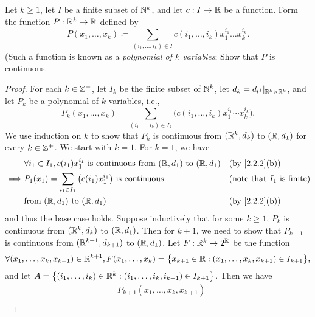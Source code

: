 \begin{ex}\label{ex:2.2.7}
  Let \(k \geq 1\), let \(I\) be a finite subset of \(\mathbb{N}^k\), and let \(c : I \to \mathbb{R}\) be a function.
  Form the function \(P : \mathbb{R}^k \to \mathbb{R}\) defined by
  \[
    P(x_1, \dots, x_k) \coloneqq \sum_{(i_1, \dots, i_k) \in I} c(i_1, \dots, i_k) x_1^{i_1} \dots x_k^{i_k}.
  \]
  (Such a function is known as a \emph{polynomial of \(k\) variables};
  Show that \(P\) is continuous.
\end{ex}

\begin{proof}
  For each \(k \in \mathbb{Z}^+\), let \(I_k\) be the finite subset of \(\mathbb{N}^k\), let \(d_k = d_{l^1}|_{\mathbb{R}^k \times \mathbb{R}^k}\), and let \(P_k\) be a polynomial of \(k\) variables, i.e.,
  \[
    P_k(x_1, \dots, x_k) = \sum_{(i_1, \dots, i_k) \in I_k} \big(c(i_1, \dots, i_k) x_1^{i_1} \cdots x_k^{i_k}\big).
  \]
  We use induction on \(k\) to show that \(P_k\) is continuous from \((\mathbb{R}^k, d_k)\) to \((\mathbb{R}, d_1)\) for every \(k \in \mathbb{Z}^+\).
  We start with \(k = 1\).
  For \(k = 1\), we have
  \begin{align*}
             & \forall i_1 \in I_1, c(i_1) x_1^{i_1} \text{ is continuous from } (\R, d_1) \text{ to } (\R, d_1) &  & \text{(by \cref{2.2.2}(b))}          \\
    \implies & P_1(x_1) = \sum_{i_1 \in I_1} \big(c(i_1) x_1^{i_1}\big) \text{ is continuous}                    &  & \text{(note that \(I_1\) is finite)} \\
             & \text{from } (\R, d_1) \text{ to } (\R, d_1)                                                      &  & \text{(by \cref{2.2.2}(b))}
  \end{align*}
  and thus the base case holds.
  Suppose inductively that for some \(k \geq 1\), \(P_k\) is continuous from \((\mathbb{R}^k, d_k)\) to \((\mathbb{R}, d_1)\).
  Then for \(k + 1\), we need to show that \(P_{k + 1}\) is continuous from \((\mathbb{R}^{k + 1}, d_{k + 1})\) to \((\mathbb{R}, d_1)\).
  Let \(F : \mathbb{R}^k \to 2^{\mathbb{R}}\) be the function
  \[
    \forall (x_1, \dots, x_k, x_{k + 1}) \in \mathbb{R}^{k + 1}, F(x_1, \dots, x_k) = \big\{x_{k + 1} \in \mathbb{R} : (x_1, \dots, x_k, x_{k + 1}) \in I_{k + 1}\big\},
  \]
  and let \(A = \big\{(i_1, \dots, i_k) \in \mathbb{R}^k : (i_1, \dots, i_k, i_{k + 1}) \in I_{k + 1}\big\}\).
  Then we have
  \begin{align*}
     & P_{k + 1}(x_1, \dots, x_k, x_{k + 1})                                                                                                                                                                        \\

\end{align*}
\end{proof}
